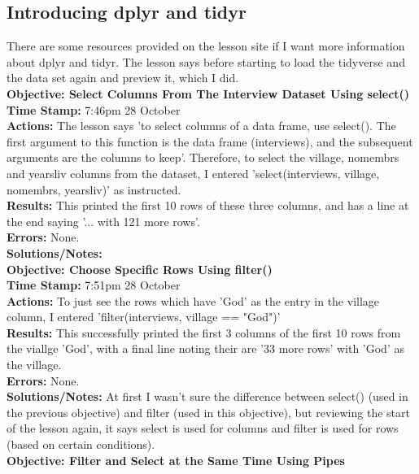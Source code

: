\documentclass{article}
\begin{document}
\begin{FlushLeft}
\subsection{Introducing dplyr and tidyr}
There are some resources provided on the lesson site if I want more information about dplyr and tidyr. The lesson says before starting to load the tidyverse and the data set again and preview it, which I did.\\
\vspace{5mm}
\textbf{Objective: Select Columns From The Interview Dataset Using select()}\\ 
\textbf{Time Stamp:} 7:46pm 28 October\\
\textbf{Actions:} The lesson says 'to select columns of a data frame, use select(). The first argument to this function is the data frame (interviews), and the subsequent arguments are the columns to keep'. Therefore, to select the village, no\textunderscore membrs and years\textunderscore liv columns from the dataset, I entered 'select(interviews, village, no\textunderscore membrs, years\textunderscore liv)' as instructed.\\
\textbf{Results:} This printed the first 10 rows of these three columns, and has a line at the end saying '... with 121 more rows'.\\
\textbf{Errors:} None.\\
\textbf{Solutions/Notes:}\\
\vspace{5mm}
\textbf{Objective: Choose Specific Rows Using filter()}\\ 
\textbf{Time Stamp:} 7:51pm 28 October\\
\textbf{Actions:} To just see the rows which have 'God' as the entry in the village column, I entered 'filter(interviews, village == "God")'\\
\textbf{Results:} This successfully printed the first 3 columns of the first 10 rows from the viallge 'God', with a final line noting their are '33 more rows' with 'God' as the village.\\
\textbf{Errors:} None.\\
\textbf{Solutions/Notes:} At first I wasn't sure the difference between select() (used in the previous objective) and filter (used in this objective), but reviewing the start of the lesson again, it says select is used for columns and filter is used for rows (based on certain conditions).\\
\vspace{5mm}
\textbf{Objective: Filter and Select at the Same Time Using Pipes}\\ 

\end{FlushLeft}
\end{document}
